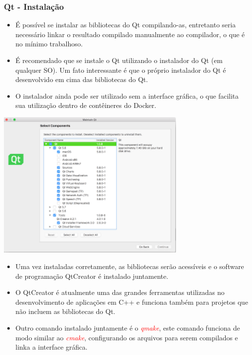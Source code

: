 \documentclass[10pt]{beamer}
\theoremstyle{remark}
\theoremstyle{definition}
\newcommand{\code}[1]{\textcolor{red} {\textit{#1}}} %
\begin{document}
\begin{frame}[allowframebreaks]
\frametitle{Qt - Instalação}

	\begin{itemize}
		\item 	É possível se instalar as bibliotecas do Qt compilando-as, entretanto seria necessário linkar o resultado compilado manualmente ao compilador, o que é no mínimo trabalhoso.
		\item É recomendado que se instale o Qt utilizando o instalador do Qt (em qualquer SO). Um fato interessante é que o próprio instalador do Qt é desenvolvido em cima das bibliotecas do Qt.
		\item O instalador ainda pode ser utilizado sem a interface gráfica, o que facilita sua utilização dentro de contêineres do Docker.
	\end{itemize}
	
	
	\framebreak
	
	\begin{center}
		\includegraphics[width=0.7\textwidth]{images/20.png}
	\end{center}
	
	\framebreak
	
	\begin{itemize}
		\item Uma vez instaladas corretamente, as bibliotecas serão acessíveis e o software de programação QtCreator é instalado juntamente.
		
		\item O QtCreator é atualmente uma das grandes ferramentas utilizadas no desenvolvimento de aplicações em C++ e funciona também para projetos que não incluem as bibliotecas do Qt.
		
		\item Outro comando instalado juntamente é o \code{qmake}, este comando funciona de modo similar ao \code{cmake}, configurando os arquivos para serem compilados e linka a interface gráfica.
		

\end{itemize}
\end{frame}
\end{document}
